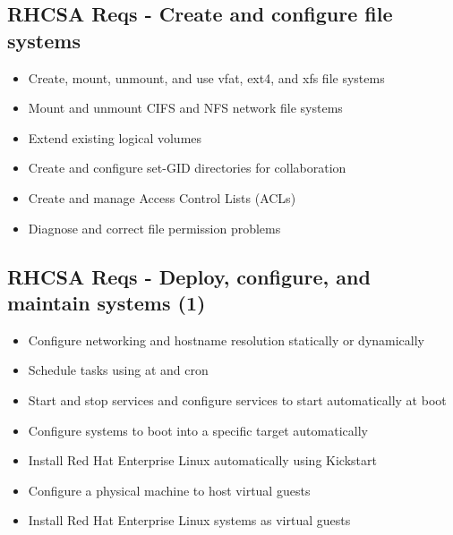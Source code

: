 \documentclass[letterpaper,10pt,english]{sphinxmanual}
\begin{document}
\subsection{RHCSA Reqs - Create and configure file systems}
\label{rhcsa:rhcsa-reqs-create-and-configure-file-systems}\begin{itemize}
\item {} 
Create, mount, unmount, and use vfat, ext4, and xfs file systems

\item {} 
Mount and unmount CIFS and NFS network file systems

\item {} 
Extend existing logical volumes

\item {} 
Create and configure set-GID directories for collaboration

\item {} 
Create and manage Access Control Lists (ACLs)

\item {} 
Diagnose and correct file permission problems

\end{itemize}


\subsection{RHCSA Reqs - Deploy, configure, and maintain systems (1)}
\label{rhcsa:rhcsa-reqs-deploy-configure-and-maintain-systems-1}\begin{itemize}
\item {} 
Configure networking and hostname resolution statically or dynamically

\item {} 
Schedule tasks using at and cron

\item {} 
Start and stop services and configure services to start automatically at boot

\item {} 
Configure systems to boot into a specific target automatically

\item {} 
Install Red Hat Enterprise Linux automatically using Kickstart

\item {} 
Configure a physical machine to host virtual guests

\item {} 
Install Red Hat Enterprise Linux systems as virtual guests

\end{itemize}
\end{document}
